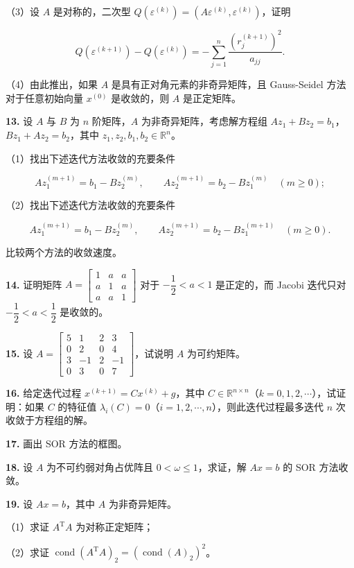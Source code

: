\documentclass[
  10pt,
  fontset=fandol]{ctexart}
\begin{document}
（3）设 \(A\) 是对称的，二次型 \(Q(\varepsilon^{(k)})=(A\varepsilon^{(k)},\varepsilon^{(k)})\)，证明

\[
Q(\varepsilon^{(k+1)})-Q(\varepsilon^{(k)})=-\sum_{j=1}^n\frac{(r_j^{(k+1)})^2}{a_{jj}}.
\]

（4）由此推出，如果 \(A\) 是具有正对角元素的非奇异矩阵，且 Gauss-Seidel 方法对于任意初始向量 \(x^{(0)}\) 是收敛的，则 \(A\) 是正定矩阵。

\textbf{13.} 设 \(A\) 与 \(B\) 为 \(n\) 阶矩阵，\(A\) 为非奇异矩阵，考虑解方程组 \(Az_1+Bz_2=b_1\)，\(Bz_1+Az_2=b_2\)，其中 \(z_1,z_2,b_1,b_2\in\mathbb R^n\)。

（1）找出下述迭代方法收敛的充要条件

\[
Az_1^{(m+1)}=b_1-Bz_2^{(m)},\qquad Az_2^{(m+1)}=b_2-Bz_1^{(m)}\quad(m\geqslant0);
\]

（2）找出下述迭代方法收敛的充要条件

\[
Az_1^{(m+1)}=b_1-Bz_2^{(m)},\qquad Az_2^{(m+1)}=b_2-Bz_1^{(m+1)}\quad(m\geqslant0).
\]

比较两个方法的收敛速度。

\textbf{14.} 证明矩阵 \(A=\begin{bmatrix}1&a&a\\a&1&a\\a&a&1\end{bmatrix}\) 对于 \(-\dfrac12<a<1\) 是正定的，而 Jacobi 迭代只对 \(-\dfrac12<a<\dfrac12\) 是收敛的。

\textbf{15.} 设 \(A=\begin{bmatrix}5&1&2&3\\0&2&0&4\\3&-1&2&-1\\0&3&0&7\end{bmatrix}\)，试说明 \(A\) 为可约矩阵。

\textbf{16.} 给定迭代过程 \(x^{(k+1)}=Cx^{(k)}+g\)，其中 \(C\in\mathbb R^{n\times n}\)（\(k=0,1,2,\cdots\)），试证明：如果 \(C\) 的特征值 \(\lambda_i(C)=0\)（\(i=1,2,\cdots,n\)），则此迭代过程最多迭代 \(n\) 次收敛于方程组的解。

\textbf{17.} 画出 SOR 方法的框图。

\textbf{18.} 设 \(A\) 为不可约弱对角占优阵且 \(0<\omega\leqslant1\)，求证，解 \(Ax=b\) 的 SOR 方法收敛。

\textbf{19.} 设 \(Ax=b\)，其中 \(A\) 为非奇异矩阵。

（1）求证 \(A^{\mathrm T}A\) 为对称正定矩阵；

（2）求证 \(\operatorname{cond}(A^{\mathrm T}A)_2=(\operatorname{cond}(A)_2)^2\)。
\end{document}
